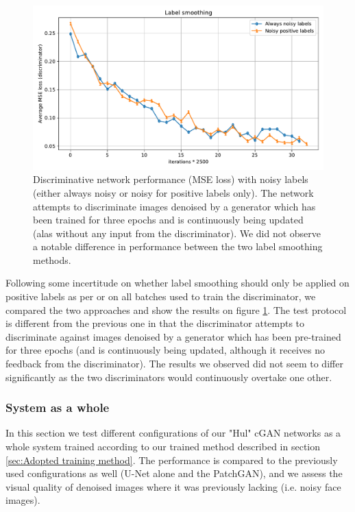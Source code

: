 \begin{figure}[!htbp]
\centering
\includegraphics[width=1\linewidth]{gfx/graphs/label-smoothing.pdf}
\caption[Discriminative network performance with noisy labels (always noisy or noisy for positive labels only)]{Discriminative network performance (\ac{MSE} loss) with noisy labels (either always noisy or noisy for positive labels only). The network attempts to discriminate images denoised by a generator which has been trained for three epochs and is continuously being updated (alas without any input from the discriminator). We did not observe a notable difference in performance between the two label smoothing methods.}
\label{fig:label-smoothing}
\end{figure}

Following some incertitude on whether label smoothing should only be applied on positive labels as per \cite{gantechniques} or on all batches used to train the discriminator, we compared the two approaches and show the results on figure \ref{fig:label-smoothing}. The test protocol is different from the previous one in that the discriminator attempts to discriminate against images denoised by a generator which has been pre-trained for three epochs (and is continuously being updated, although it receives no feedback from the discriminator). The results we observed did not seem to differ significantly as the two discriminators would continuously overtake one other.

\subsubsection{System as a whole}\label{sec:System as a whole}

In this section we test different configurations of our "Hul" \ac{cGAN} networks as a whole system trained according to our trained method described in section \ref{sec:Adopted training method}. The performance is compared to the previously used configurations as well (U-Net alone and the PatchGAN), and we assess the visual quality of denoised images where it was previously lacking (i.e. noisy face images).

